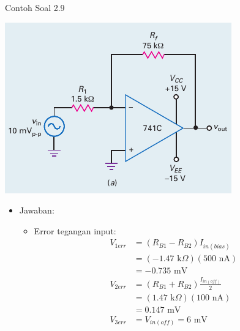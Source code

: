 \begin{frame}{Contoh Soal 2.9}
	\begin{multicols}{2}
		\begin{center}
			\includegraphics[width=\linewidth]{gambar/fig-16.17a}
		\end{center}
		\columnbreak
		\begin{itemize}
			\item Jawaban:
			\begin{itemize}
				\item Error tegangan input:
				\begin{align*}
					V_{1err} &= (R_{B1} - R_{B2})I_{in(bias)} \\
					&= ( - 1.47 \text{ k}\Omega )(500 \text{ nA}) \\
					&= -0.735 \text{ mV} \\
					V_{2err} &= (R_{B1} + R_{B2}) \frac{I_{in(off)}}{2} \\
					&= ( 1.47 \text{ k}\Omega )(100 \text{ nA}) \\
					&= 0.147 \text{ mV} \\
					V_{3err} &= V_{in(off)} = 6 \text{ mV}
				\end{align*}
			\end{itemize}
		\end{itemize}
	\end{multicols}
\end{frame}

